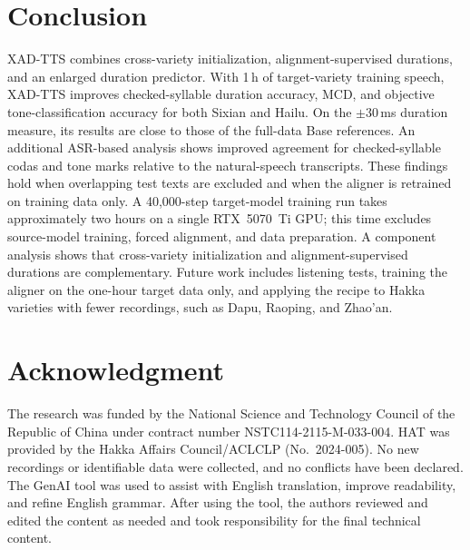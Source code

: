 \documentclass[conference,a4paper]{IEEEtran}
\begin{document}
\section{Conclusion}
XAD-TTS combines cross-variety initialization, alignment-supervised durations, and an enlarged duration predictor. With 1\,h of target-variety training speech, XAD-TTS improves checked-syllable duration accuracy, MCD, and objective tone-classification accuracy for both Sixian and Hailu. On the $\pm$30\,ms duration measure, its results are close to those of the full-data Base references. An additional ASR-based analysis shows improved agreement for checked-syllable codas and tone marks relative to the natural-speech transcripts. These findings hold when overlapping test texts are excluded and when the aligner is retrained on training data only.
A 40{,}000-step target-model training run takes approximately two hours on a single RTX~5070~Ti GPU; this time excludes source-model training, forced alignment, and data preparation. A component analysis shows that cross-variety initialization and alignment-supervised durations are complementary. Future work includes listening tests, training the aligner on the one-hour target data only, and applying the recipe to Hakka varieties with fewer recordings, such as Dapu, Raoping, and Zhao'an.

\section*{Acknowledgment}
The research was funded by the National Science and Technology Council of the Republic of China under contract number NSTC114-2115-M-033-004. HAT was provided by the Hakka Affairs Council/ACLCLP (No.~2024-005). No new recordings or identifiable data were collected, and no conflicts have been declared. The GenAI tool was used to assist with English translation, improve readability, and refine English grammar. After using the tool, the authors reviewed and edited the content as needed and took responsibility for the final technical content.
\end{document}
